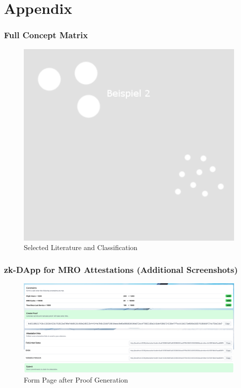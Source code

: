 \appendix

\chapter{Appendix}
\subsection*{Full Concept Matrix} \label{Appendix A}
\begin{figure}[hbt]
	\centering
		\includegraphics[width=1.0\textwidth]{Pictures/bsp2.png}
	\caption{Selected Literature and Classification}
	\label{fig:test}
\end{figure}

\subsection*{zk-DApp for MRO Attestations (Additional Screenshots)} \label{Appendix B}

\begin{figure}[hbt]
	\centering
		\includegraphics[width=1.0\textwidth]{Pictures/form_proof_const.png}
	\caption{Form Page after Proof Generation}
	\label{fig:form_proof}
\end{figure}

